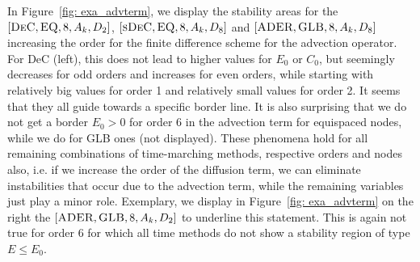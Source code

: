 In Figure~\ref{fig: exa_advterm}, we display the stability areas for the $[\textsc{DeC},\textsc{EQ},8, A_k,D_2]$, $[\textsc{sDeC},\textsc{EQ},8, A_k,D_8]$ and $[\textsc{ADER},\textsc{GLB},8, A_k,D_8]$ increasing the order for the finite difference scheme for the advection operator. 
For DeC (left), this does not lead to higher values for $E_0$ or $C_0$, but seemingly decreases for odd orders and increases for even orders, while starting with relatively big values for order 1 and relatively small values for order 2. 
It seems that they all guide towards a specific border line. It is also surprising that  we do not get a border $E_0>0$ for order 6 in the advection term for equispaced nodes, while we do for GLB ones (not displayed). 
These phenomena hold for all remaining combinations of time-marching methods, respective orders and nodes also, i.e. if we increase the order of the diffusion term, we can eliminate instabilities that occur due to the advection term, while the remaining variables just play a minor role. 
Exemplary, we display in Figure~\ref{fig: exa_advterm} on the right the $[\textsc{ADER},\textsc{GLB},8, A_k,D_2]$  to underline this statement. 
This is again not true for order 6 for which all time methods do not show a stability region of type $E\leq E_0$.
